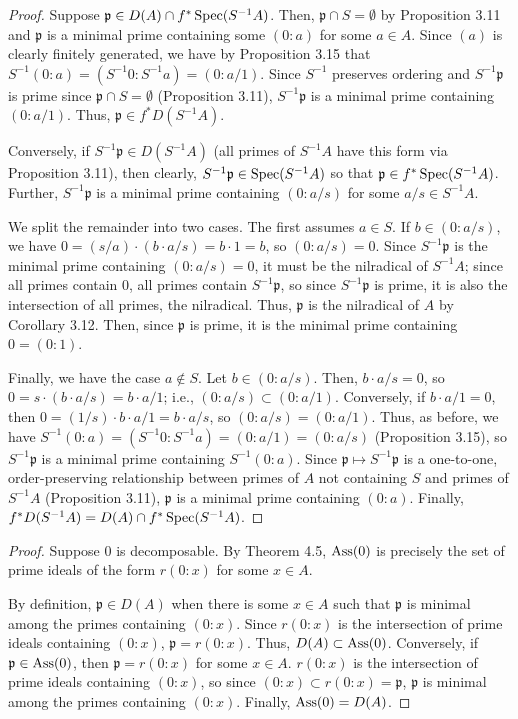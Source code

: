 \begin{proof}
Suppose $\mathfrak{p} \in D(A) \cap f^*\operatorname{Spec}(S^{-1}A)$. Then, $\mathfrak{p} \cap S = \emptyset$ by Proposition 3.11 and $\mathfrak{p}$ is a minimal prime
containing some $(0:a)$ for some $a \in A$. Since $(a)$ is clearly finitely generated, we have by Proposition 3.15 that $S^{-1}(0:a) = (S^{-1}0:S^{-1}a) = (0:a/1)$.
Since $S^{-1}$ preserves ordering and $S^{-1}\mathfrak{p}$ is prime since $\mathfrak{p}\cap S = \emptyset$ (Proposition 3.11), $S^{-1}\mathfrak{p}$ is a
minimal prime containing $(0:a/1)$. Thus, $\mathfrak{p} \in f^*D(S^{-1}A)$.

Conversely, if $S^{-1}\mathfrak{p} \in D(S^{-1}A)$ (all primes of $S^{-1}A$ have this form via Proposition 3.11), then clearly, $S^{-1}\mathfrak{p} \in \operatorname{Spec}(S^{-1}A)$
so that $\mathfrak{p} \in f^*\operatorname{Spec}(S^{-1}A)$. Further, $S^{-1}\mathfrak{p}$ is a minimal prime containing $(0:a/s)$ for some $a/s \in S^{-1}A$. 

We split the remainder into two cases. The first assumes $a \in S$. If $b \in (0:a/s)$, we have $0 = (s/a) \cdot (b \cdot a/s) = b \cdot 1 = b$, so $(0:a/s) = 0$. Since $S^{-1}\mathfrak{p}$ is 
the minimal prime containing $(0:a/s) = 0$, it must be the nilradical of $S^{-1}A$; since all primes contain $0$, all primes contain $S^{-1}\mathfrak{p}$, so since $S^{-1}\mathfrak{p}$ 
is prime, it is also the intersection of all primes, the nilradical. Thus, $\mathfrak{p}$ is the nilradical of $A$ by Corollary 3.12. Then, since $\mathfrak{p}$ is prime, it is the
minimal prime containing $0 = (0:1)$.

Finally, we have the case $a \not\in S$. Let $b \in (0:a/s)$. Then, $b \cdot a/s = 0$, so $0 = s \cdot (b\cdot a/s) = b \cdot a/1$; i.e., $(0:a/s) \subset (0:a/1)$. Conversely, if 
$b \cdot a/1 = 0$, then $0 = (1/s)\cdot b \cdot a/1 = b \cdot a/s$, so $(0:a/s) = (0:a/1)$. Thus, as before, we have $S^{-1}(0:a) = (S^{-1}0:S^{-1}a) = (0:a/1) = (0:a/s)$ (Proposition 3.15), 
so $S^{-1}\mathfrak{p}$ is a minimal prime containing $S^{-1}(0:a)$. Since $\mathfrak{p} \mapsto S^{-1}\mathfrak{p}$ is a one-to-one, order-preserving relationship between primes of $A$ not 
containing $S$ and primes of $S^{-1}A$ (Proposition 3.11), $\mathfrak{p}$ is a minimal prime containing $(0:a)$. Finally, $f^*D(S^{-1}A) = D(A) \cap f^*\operatorname{Spec}(S^{-1}A)$.
\end{proof}

\begin{proof}
Suppose $0$ is decomposable. By Theorem 4.5, $\operatorname{Ass}(0)$ is precisely the set of prime ideals of the form $r(0:x)$ for some $x \in A$. 

By definition, $\mathfrak{p} \in D(A)$ when there is some $x \in A$ such that $\mathfrak{p}$ is minimal among the primes containing $(0:x)$. Since $r(0:x)$ is the 
intersection of prime ideals containing $(0:x)$, $\mathfrak{p} = r(0:x)$. Thus, $D(A) \subset \operatorname{Ass}(0)$. Conversely, if $\mathfrak{p} \in \operatorname{Ass}(0)$, then $\mathfrak{p} = r(0:x)$
for some $x \in A$. $r(0:x)$ is the intersection of prime ideals containing $(0:x)$, so since $(0:x) \subset r(0:x) = \mathfrak{p}$, $\mathfrak{p}$ is minimal among the primes
containing $(0:x)$. Finally, $\operatorname{Ass}(0) = D(A)$.
\end{proof}

